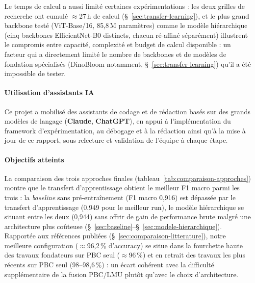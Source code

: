 Le temps de calcul a aussi limité certaines expérimentations : les deux grilles de recherche ont cumulé $\approx$27\,h de calcul (\S~\ref{sec:transfer-learning}), et le plus grand backbone testé (ViT-Base/16, 85,8\,M paramètres) comme le modèle hiérarchique (cinq backbones EfficientNet-B0 distincts, chacun ré-affiné séparément) illustrent le compromis entre capacité, complexité et budget de calcul disponible : un facteur qui a directement limité le nombre de backbones et de modèles de fondation spécialisés (DinoBloom notamment, \S~\ref{sec:transfer-learning}) qu'il a été impossible de tester.

\paragraph{Utilisation d'assistants IA}

Ce projet a mobilisé des assistants de codage et de rédaction basés sur des grands modèles de langage (\textbf{Claude}, \textbf{ChatGPT}), en appui à l'implémentation du framework d'expérimentation, au débogage et à la rédaction ainsi qu'à la mise à jour de ce rapport, sous relecture et validation de l'équipe à chaque étape.

\paragraph{Objectifs atteints}

La comparaison des trois approches finales (tableau~\ref{tab:comparaison-approches}) montre que le transfert d’apprentissage obtient le meilleur F1 macro parmi les trois : la \emph{baseline} sans pré-entraînement (F1 macro 0,916) est dépassée par le transfert d'apprentissage (0,949 pour le meilleur run), le modèle hiérarchique se situant entre les deux (0,944) sans offrir de gain de performance brute malgré une architecture plus coûteuse (\S~\ref{sec:baseline}--\S~\ref{sec:modele-hierarchique}).
Rapportée aux références publiées (\S~\ref{sec:comparaison-litterature}), notre meilleure configuration ($\approx$96,2\,\% d'accuracy) se situe dans la fourchette haute des travaux fondateurs sur PBC seul ($\approx$96\,\%) et en retrait des travaux les plus récents sur PBC seul (98--98,6\,\%) : un écart cohérent avec la difficulté supplémentaire de la fusion PBC/LMU plutôt qu'avec le choix d'architecture.

